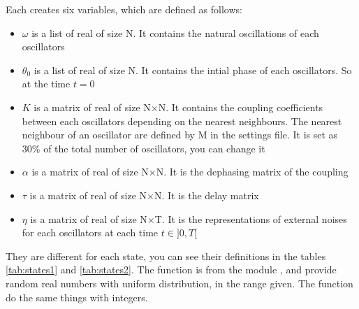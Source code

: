 \documentclass[1pt, a4paper]{article}
\begin{document}
Each  creates six variables, which are defined as follows:
\begin{itemize}
        \item $\omega$ is a list of real of size N. It contains the natural oscillations of each oscillators
        \item $\theta_0$ is a list of real of size N. It contains the intial phase of each oscillators. So at the time $t=0$
        \item $K$ is a matrix of real of size N$\times$N. It contains the coupling coefficients between each oscillators depending on the nearest neighbours. The nearest neighbour of an oscillator are defined by M in the settings file. It is set as $30\%$ of the total number of oscillators, you can change it
        \item $\alpha$ is a matrix of real of size N$\times$N. It is the dephasing matrix of the coupling
        \item $\tau$ is a matrix of real of size N$\times$N. It is the delay matrix
        \item $\eta$ is a matrix of real of size N$\times$T. It is the representations of external noises for each oscillators at each time $t\in ]0, T[$
\end{itemize}
They are different for each state, you can see their definitions in the tables \ref{tab:states1} and \ref{tab:states2}. The function  is from the module , and provide random real numbers with uniform distribution, in the range given. The function  do the same things with integers.
\end{document}
